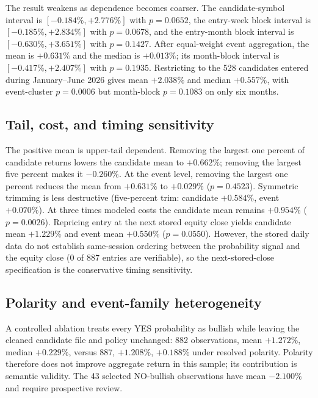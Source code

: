 \documentclass[sigconf,anonymous]{acmart}
\begin{document}
The result weakens as dependence becomes coarser. The candidate-symbol interval is $[-0.184\%,+2.776\%]$ with $p=0.0652$, the entry-week block interval is $[-0.185\%,+2.834\%]$ with $p=0.0678$, and the entry-month block interval is $[-0.630\%,+3.651\%]$ with $p=0.1427$. After equal-weight event aggregation, the mean is $+0.631\%$ and the median is $+0.013\%$; its month-block interval is $[-0.417\%,+2.407\%]$ with $p=0.1935$. Restricting to the 528 candidates entered during January--June 2026 gives mean $+2.038\%$ and median $+0.557\%$, with event-cluster $p=0.0006$ but month-block $p=0.1083$ on only six months.



\subsection{Tail, cost, and timing sensitivity}

The positive mean is upper-tail dependent. Removing the largest one percent of candidate returns lowers the candidate mean to $+0.662\%$; removing the largest five percent makes it $-0.260\%$. At the event level, removing the largest one percent reduces the mean from $+0.631\%$ to $+0.029\%$ ($p=0.4523$). Symmetric trimming is less destructive (five-percent trim: candidate $+0.584\%$, event $+0.070\%$). At three times modeled costs the candidate mean remains $+0.954\%$ ($p=0.0026$). Repricing entry at the next stored equity close yields candidate mean $+1.229\%$ and event mean $+0.550\%$ ($p=0.0550$). However, the stored daily data do not establish same-session ordering between the probability signal and the equity close (0 of 887 entries are verifiable), so the next-stored-close specification is the conservative timing sensitivity.

\subsection{Polarity and event-family heterogeneity}

A controlled ablation treats every YES probability as bullish while leaving the cleaned candidate file and policy unchanged: 882 observations, mean $+1.272\%$, median $+0.229\%$, versus 887, $+1.208\%$, $+0.188\%$ under resolved polarity. Polarity therefore does not improve aggregate return in this sample; its contribution is semantic validity. The 43 selected NO-bullish observations have mean $-2.100\%$ and require prospective review.
\end{document}
